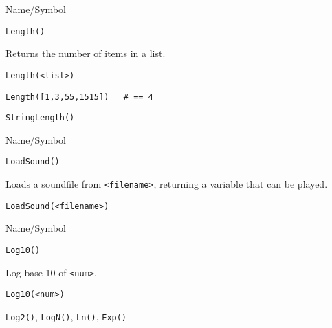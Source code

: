 \rl


\begin{desc}{Name/Symbol}
\item[Name/Symbol]	\verb+Length()+

\item[Description]	Returns the number of items in a list.

\item[Usage]
\begin{verbatim}
Length(<list>)
\end{verbatim}

\item[Example]
\begin{verbatim}
Length([1,3,55,1515])	# == 4
\end{verbatim}

\item[See Also]	\verb+StringLength()+
\end{desc}

\rl



\begin{desc}{Name/Symbol}
\item[Name/Symbol]	\verb+LoadSound()+

\item[Description]	Loads a soundfile from \verb+<filename>+, 
		returning a variable that can be played.

\item[Usage]
\begin{verbatim}
LoadSound(<filename>)
\end{verbatim}

\item[Example]	

\item[See Also]	
\end{desc}

\rl



\begin{desc}{Name/Symbol}
\item[Name/Symbol]	\verb+Log10()+

\item[Description]	Log base 10 of \verb+<num>+.

\item[Usage]
\begin{verbatim}
Log10(<num>)
\end{verbatim}

\item[Example]	

\item[See Also]	\verb+Log2()+, \verb+LogN()+, \verb+Ln()+, \verb+Exp()+
\end{desc}

